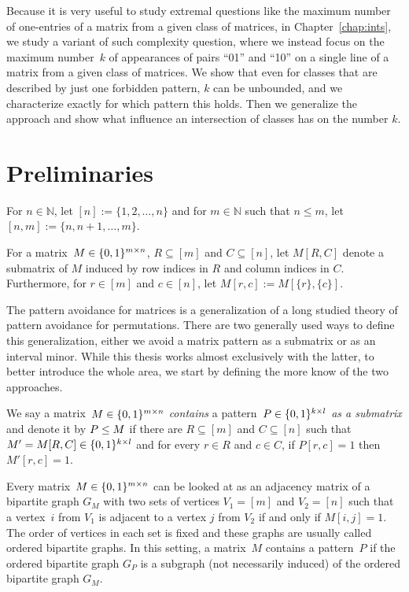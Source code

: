 Because it is very useful to study extremal questions like the maximum number of one-entries of a matrix from a given class of matrices, in Chapter~\ref{chap:ints}, we study a variant of such complexity question, where we instead focus on the maximum number~$k$ of appearances of pairs ``01'' and ``10'' on a single line of a matrix from a given class of matrices. We show that even for classes that are described by just one forbidden pattern, $k$ can be unbounded, and we characterize exactly for which pattern this holds. Then we generalize the approach and show what influence an intersection of classes has on the number $k$.

\section{Preliminaries}
\begin{ntn}
For $n\in\mathbb{N}$, let $[n]:=\{1,2,\dots,n\}$ and for $m\in\mathbb{N}$ such that $n\leq m$, let $[n,m]:=\{n,n+1,\dots,m\}$.
\end{ntn}

\begin{ntn}
For a matrix~$M\in\{0,1\}^{m\times n}$, $R\subseteq[m]$ and $C\subseteq[n]$, let $M[R,C]$ denote a submatrix of $M$ induced by row indices in $R$ and column indices in $C$. Furthermore, for $r\in[m]$ and $c\in[n]$, let $M[r,c]:=M[\{r\},\{c\}]$.
\end{ntn}

The pattern avoidance for matrices is a generalization of a long studied theory of pattern avoidance for permutations. There are two generally used ways to define this generalization, either we avoid a matrix pattern as a submatrix or as an interval minor. While this thesis works almost exclusively with the latter, to better introduce the whole area, we start by defining the more know of the two approaches.

\begin{defn}
We say a matrix~$M\in\{0,1\}^{m\times n}$ \emph{contains} a pattern~$P\in\{0,1\}^{k\times l}$ \emph{as a submatrix} and denote it by $P\leq M$ if there are $R\subseteq[m]$ and $C\subseteq[n]$ such that $M'=M[R,C]\in\{0,1\}^{k\times l}$ and for every $r\in R$ and $c\in C$, if $P[r,c]=1$ then $M'[r,c]=1$.
\end{defn}

Every matrix~$M\in\{0,1\}^{m\times n}$ can be looked at as an adjacency matrix of a bipartite graph $G_M$ with two sets of vertices $V_1=[m]$ and $V_2=[n]$ such that a vertex~$i$ from $V_1$ is adjacent to a vertex $j$ from $V_2$ if and only if $M[i,j]=1$. The order of vertices in each set is fixed and these graphs are usually called ordered bipartite graphs. In this setting, a matrix~$M$ contains a pattern~$P$ if the ordered bipartite graph $G_P$ is a subgraph (not necessarily induced) of the ordered bipartite graph $G_M$.

